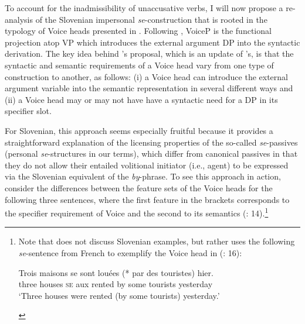 \documentclass[output=paper,
modfonts,nonflat,
newtxmath
]{langsci/langscibook}
\begin{document}
To account for the inadmissibility of unaccusative verbs, I will now propose a re-analysis of the Slovenian impersonal \textit{se}-construction that is rooted in the typology of Voice heads presented in \citet{schaffer2017}. Following \citet{kratzer1996}, VoiceP is the functional projection atop VP which introduces the external argument DP into the syntactic derivation. The key idea behind \citeauthor{schaffer2017}’s proposal, which is an update of \citeauthor{kratzer1996}’s, is that the syntactic and semantic requirements of a Voice head vary from one type of construction to another, as follows: (i) a Voice head can introduce the external argument variable into the semantic representation in several different ways and (ii) a Voice head may or may not have have a syntactic need for a DP in its specifier slot. \par
For Slovenian, this approach seems especially fruitful because it provides a straightforward explanation of the licensing properties of the so-called \textit{se}-passives (personal \textit{se}-structures in our terms), which differ from canonical passives in that they do not allow their entailed volitional initiator (i.e., agent) to be expressed via the Slovenian equivalent of the \textit{by}-phrase. To see this approach in action, consider the differences between the feature sets of the Voice heads for the following three sentences, where the first feature in the brackets corresponds to the specifier requirement of Voice and the second to its semantics (\citealt{schaffer2017}: 14).\footnote{Note that \citet{schaffer2017} does not discuss Slovenian examples, but rather uses the following \textit{se}-sentence from French to exemplify  the Voice head in  (\citealt{schaffer2017}: 16):
\begin{exe}
\ex \gll Trois maisons se sont louées (*\hspace{-2pt} par des touristes) hier.\\
three houses \textsc{se} aux rented {} by some tourists yesterday\\
\trans `Three houses were rented (by some tourists) yesterday.'
\end{exe}}
\end{document}
